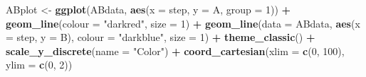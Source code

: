 \documentclass[]{article}
\newenvironment{Shaded}{\begin{snugshade}}{\end{snugshade}}
\newcommand{\KeywordTok}[1]{\textcolor[rgb]{0.13,0.29,0.53}{\textbf{#1}}}
\newcommand{\DataTypeTok}[1]{\textcolor[rgb]{0.13,0.29,0.53}{#1}}
\newcommand{\DecValTok}[1]{\textcolor[rgb]{0.00,0.00,0.81}{#1}}
\newcommand{\StringTok}[1]{\textcolor[rgb]{0.31,0.60,0.02}{#1}}
\newcommand{\OperatorTok}[1]{\textcolor[rgb]{0.81,0.36,0.00}{\textbf{#1}}}
\newcommand{\NormalTok}[1]{#1}
\begin{document}
\begin{Shaded}
\begin{Highlighting}[]
\NormalTok{ABplot <-}\StringTok{ }\KeywordTok{ggplot}\NormalTok{(ABdata, }\KeywordTok{aes}\NormalTok{(}\DataTypeTok{x =}\NormalTok{ step, }\DataTypeTok{y =}\NormalTok{ A, }\DataTypeTok{group =} \DecValTok{1}\NormalTok{)) }\OperatorTok{+}
\StringTok{  }\KeywordTok{geom_line}\NormalTok{(}\DataTypeTok{colour =} \StringTok{"darkred"}\NormalTok{, }\DataTypeTok{size =} \DecValTok{1}\NormalTok{) }\OperatorTok{+}\StringTok{ }
\StringTok{  }\KeywordTok{geom_line}\NormalTok{(}\DataTypeTok{data =}\NormalTok{ ABdata, }\KeywordTok{aes}\NormalTok{(}\DataTypeTok{x =}\NormalTok{ step, }\DataTypeTok{y =}\NormalTok{ B), }\DataTypeTok{colour =} \StringTok{"darkblue"}\NormalTok{, }\DataTypeTok{size =} \DecValTok{1}\NormalTok{) }\OperatorTok{+}
\StringTok{  }\KeywordTok{theme_classic}\NormalTok{() }\OperatorTok{+}\StringTok{ }
\StringTok{  }\KeywordTok{scale_y_discrete}\NormalTok{(}\DataTypeTok{name =} \StringTok{"Color"}\NormalTok{) }\OperatorTok{+}
\StringTok{  }\KeywordTok{coord_cartesian}\NormalTok{(}\DataTypeTok{xlim =} \KeywordTok{c}\NormalTok{(}\DecValTok{0}\NormalTok{, }\DecValTok{100}\NormalTok{), }\DataTypeTok{ylim =} \KeywordTok{c}\NormalTok{(}\DecValTok{0}\NormalTok{, }\DecValTok{2}\NormalTok{))}
\end{Highlighting}
\end{Shaded}
\end{document}
